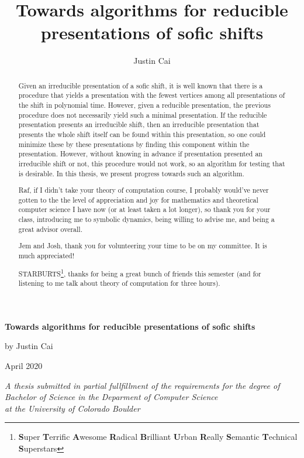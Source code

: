 \documentclass[hidelinks]{report}
\title{Towards algorithms for reducible presentations of sofic shifts}
\author{Justin Cai}
\theoremstyle{definition}
\begin{document}
\begin{titlepage}
    \raggedright
    \vspace*{3cm}
    {\fontsize{30}{100}\selectfont 
    \textbf{Towards algorithms for reducible presentations of sofic shifts}}

    \vspace{.75cm}
    \LARGE by Justin Cai

    \vspace{.75cm}
    \Large April 2020

    \vspace{4cm}
    \normalsize \textit{A thesis submitted in partial fullfillment of
    the requirements for the degree of Bachelor of Science in the Deparment of Computer Science \\
    at the University of Colorado Boulder  }
\end{titlepage}

\begin{abstract}
    \thispagestyle{plain}
    Given an irreducible presentation of a sofic shift, it is well known 
    that there is a procedure that yields a presentation with the fewest
    vertices among all presentations of the shift in polynomial time. However, 
    given a reducible presentation,
    the previous procedure does not necessarily yield such a minimal presentation.
    If the reducible presentation presents an irreducible shift, 
    then an irreducible presentation that presents the whole shift itself
    can be found within this presentation,
    so one could minimize these by these presentations by finding this 
    component within the presentation. However, without knowing in advance
    if presentation presented an irreducible shift or not, this procedure
    would not work, so an algorithm for testing that is desirable. 
    In this thesis, we present progress towards such an algorithm.
\end{abstract}

\renewcommand{\abstractname}{Acknowledgements}
\begin{abstract}
    \setcounter{page}{2}
    \thispagestyle{plain}
Raf, if I didn't take your theory of computation course, I probably would've 
never gotten to the the level of appreciation and joy for mathematics and 
theoretical computer science I have now (or at least taken a lot longer),
so thank you for your class, introducing me to 
symbolic dynamics, being willing to advise me, and being a great advisor overall.

\vspace{.5cm}\noindent Jem and Josh, thank you for volunteering your time to be on my committee.
It is much appreciated!

\vspace{.5cm}\noindent STARBURTS\footnote{
\textbf{S}uper 
\textbf{T}errific 
\textbf{A}wesome 
\textbf{R}adical 
\textbf{B}rilliant 
\textbf{U}rban 
\textbf{R}eally 
\textbf{S}emantic 
\textbf{T}echnical 
\textbf{S}uperstars}, thanks for being 
a great bunch of friends this semester (and for listening to me talk about theory 
of computation for three hours).
\end{abstract}
\end{document}

